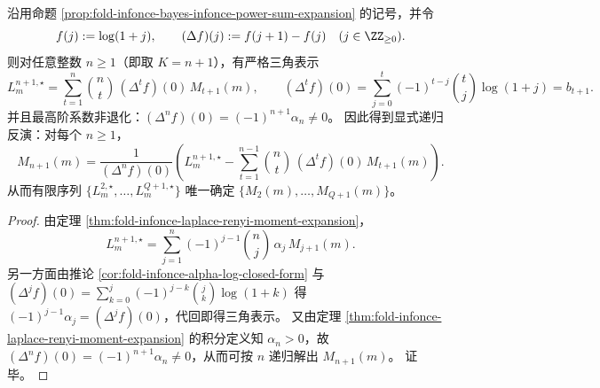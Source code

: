 
\begin{corollary}\label{cor:fold-infonce-triangular-inversion-collision-spectrum}
沿用命题 \ref{prop:fold-infonce-bayes-infonce-power-sum-expansion} 的记号，并令
\[
f(j):=\log(1+j),\qquad (\Delta f)(j):=f(j+1)-f(j)
\quad(j\in\ZZ_{\ge 0}).
\]
则对任意整数 \(n\ge 1\)（即取 \(K=n+1\)），有严格三角表示
\[
L_m^{n+1,\star}
=\sum_{t=1}^{n}\binom{n}{t}\,(\Delta^t f)(0)\,M_{t+1}(m),
\qquad
(\Delta^t f)(0)=\sum_{j=0}^{t}(-1)^{t-j}\binom{t}{j}\log(1+j)=b_{t+1}.
\]
并且最高阶系数非退化：\((\Delta^{n}f)(0)=(-1)^{n+1}\alpha_n\neq 0\)。
因此得到显式递归反演：对每个 \(n\ge 1\)，
\[
M_{n+1}(m)
=\frac{1}{(\Delta^{n}f)(0)}
\left(
L_m^{n+1,\star}-\sum_{t=1}^{n-1}\binom{n}{t}\,(\Delta^{t}f)(0)\,M_{t+1}(m)
\right).
\]
从而有限序列 \(\{L_m^{2,\star},\dots,L_m^{Q+1,\star}\}\) 唯一确定 \(\{M_2(m),\dots,M_{Q+1}(m)\}\)。
\end{corollary}
\begin{proof}
由定理 \ref{thm:fold-infonce-laplace-renyi-moment-expansion}，
\[
L_m^{n+1,\star}
=\sum_{j=1}^{n}(-1)^{j-1}\binom{n}{j}\,\alpha_j\,M_{j+1}(m).
\]
另一方面由推论 \ref{cor:fold-infonce-alpha-log-closed-form} 与 \((\Delta^j f)(0)=\sum_{k=0}^{j}(-1)^{j-k}\binom{j}{k}\log(1+k)\) 得
\(
(-1)^{j-1}\alpha_j=(\Delta^j f)(0)
\)，代回即得三角表示。
又由定理 \ref{thm:fold-infonce-laplace-renyi-moment-expansion} 的积分定义知 \(\alpha_n>0\)，故 \((\Delta^n f)(0)=(-1)^{n+1}\alpha_n\neq 0\)，从而可按 \(n\) 递归解出 \(M_{n+1}(m)\)。
证毕。
\end{proof}


